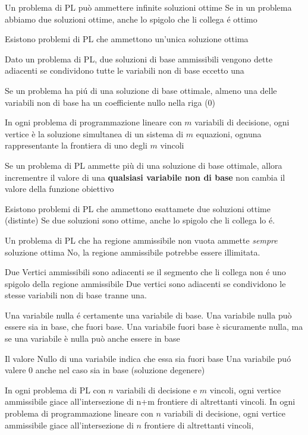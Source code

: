 \documentclass[12pt, a4paper, openany]{book}
\begin{document}
\affermazionetrue
{Un problema di PL può ammettere infinite soluzioni ottime}
{Se in un problema abbiamo due soluzioni ottime, anche lo spigolo che li collega é ottimo }

\affermazionetrue
{Esistono problemi di PL che ammettono un'unica soluzione ottima}

\affermazionetrue
{Dato un problema di PL, due soluzioni di base ammissibili vengono dette adiacenti se condividono tutte le variabili non di base eccetto una}

\affermazione
{Se un problema ha piú di una soluzione di base ottimale, almeno una delle variabili non di base ha un coefficiente nullo nella riga (0)}

\affermazione
{In ogni problema di programmazione lineare con $m$ variabili di decisione, ogni vertice è la soluzione simultanea
di un sistema di $m$ equazioni, ognuna rappresentante la frontiera di uno degli $m$ vincoli}
{}

\affermazione
{Se un problema di PL ammette più di una soluzione di base ottimale, allora incrementre il valore di una \textbf{qualsiasi variabile non di base} non cambia il valore della funzione obiettivo}


\affermazionefalse
{Esistono problemi di PL che ammettono esattamete due soluzioni ottime (distinte)}
{Se due soluzioni sono ottime, anche lo spigolo che li collega lo é.}

\affermazionefalse
{Un problema di PL che ha regione ammissibile non vuota ammette \emph{sempre} soluzione ottima}
{No, la regione ammissibile potrebbe essere illimitata.}


\affermazionefalse
{Due Vertici ammissibili sono adiacenti se il segmento che li collega non é uno spigolo della regione ammissibile}
{Due vertici sono adiacenti se condividono le stesse variabili non di base tranne una.}

\affermazionefalse
{Una variabile nulla é certamente una variabile di base.}
{Una variabile nulla può essere sia in base, che fuori base. Una variabile fuori base è sicuramente nulla,
ma se una variabile è nulla può anche essere in base}

\affermazionefalse
{Il valore Nullo di una variabile indica che essa sia fuori base}
{Una variabile puó valere 0 anche nel caso sia in base (soluzione degenere)}

\affermazionefalse
{In ogni problema di PL con $n$ variabili di decisione e $m$ vincoli, ogni vertice ammissibile giace all'intersezione di n+m frontiere di altrettanti vincoli.}
{In ogni problema di programmazione lineare con $n$
variabili di decisione, ogni vertice ammissibile giace
all'intersezione di $n$ frontiere di altrettanti vincoli, }
\end{document}
